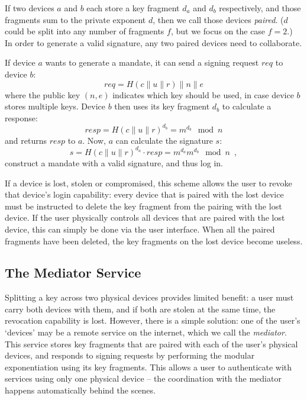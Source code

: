 \documentclass{llncs}
\newcommand*{\concat}{\mathbin{\|}}
\begin{document}
If two devices $a$ and $b$ each store a key fragment $d_a$ and $d_b$ respectively, and those
fragments sum to the private exponent $d$, then we call those devices \emph{paired}. ($d$ could be
split into any number of fragments $f$, but we focus on the case $f=2$.) In order to
generate a valid signature, any two paired devices need to collaborate.

If device $a$ wants to generate a mandate, it can send a signing request $\mathit{req}$ to device $b$:
\begin{equation}
\mathit{req} = H(c \concat u \concat r) \concat n \concat e
\end{equation}
where the public key $(n, e)$ indicates which key should be used, in case device $b$ stores multiple
keys. Device $b$ then uses its key fragment $d_b$ to calculate a response:
\begin{equation}
\mathit{resp} = H(c \concat u \concat r)^{d_b} = m^{d_b} \mod n
\end{equation}
and returns $\mathit{resp}$ to $a$. Now, $a$ can calculate the signature $s$:
\begin{equation}
s = H(c \concat u \concat r)^{d_a} \cdot \mathit{resp} = m^{d_a} m^{d_b} \mod n \enspace,
\end{equation}
construct a mandate with a valid signature, and thus log in.

If a device is lost, stolen or compromised, this scheme allows the user to revoke that device's
login capability: every device that is paired with the lost device must be instructed to delete the
key fragment from the pairing with the lost device. If the user physically controls all devices that
are paired with the lost device, this can simply be done via the user interface. When all the paired
fragments have been deleted, the key fragments on the lost device become useless.

\subsection{The Mediator Service}\label{sec:mediator}

Splitting a key across two physical devices provides limited benefit: a user must carry both devices
with them, and if both are stolen at the same time, the revocation capability is lost. However,
there is a simple solution: one of the user's `devices' may be a remote service on the internet,
which we call the \emph{mediator}. This service stores key fragments that are paired with each of
the user's physical devices, and responds to signing requests by performing the modular
exponentiation using its key fragments. This allows a user to authenticate with services using only
one physical device -- the coordination with the mediator happens automatically behind the scenes.
\end{document}

